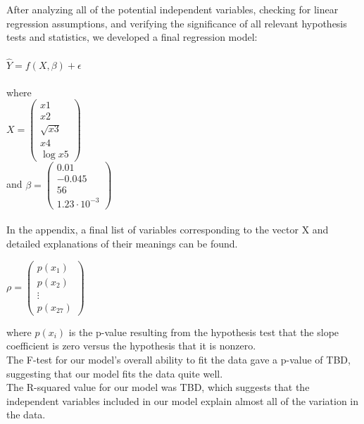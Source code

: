\documentclass[oneside,12pt]{report}
\begin{document}
After analyzing all of the potential independent variables, checking for linear regression assumptions, and verifying the significance of all relevant hypothesis tests and statistics, we developed a final regression model:
\\
\\
\begin{math}
\hat{Y} = f(X,\beta) + \epsilon
\end{math}
\\
\\
where
\\
\begin{math} X = 
\begin{pmatrix}
x1 \\ x2 \\ \sqrt{x3} \\ x4 \\ \log{x5}
\end{pmatrix}
\end{math}
\\
and
\begin{math} \beta =
\begin{pmatrix}
0.01 \\ -0.045 \\ 56 \\ 1.23\cdot10^{-3}
\end{pmatrix}
\end{math}
\\ \\
In the appendix, a final list of variables corresponding to the vector X and detailed explanations of their meanings can be found.

\begin{math} \rho =
\begin{pmatrix}
p(x_1) \\ p(x_2) \\ \vdots \\p(x_{27})
\end{pmatrix}
\end{math}

where \begin{math}p(x_i)\end{math} is the p-value resulting from the hypothesis test that the slope coefficient is zero versus the hypothesis that it is nonzero.
\\
The F-test for our model's overall ability to fit the data gave a p-value of TBD, suggesting that our model fits the data quite well.
\\
The R-squared value for our model was TBD, which suggests that the independent variables included in our model explain almost all of the variation in the data.
\end{document}
